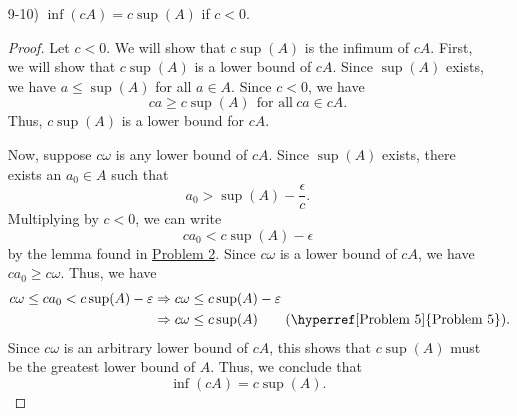 \documentclass[11pt,a4paper]{article}
\begin{document}
\begin{enumerate}
\begin{enumerate}
\begin{proof}
            Let \( c \varphi  \) be any upper bound of \( cA  \). Let \( \epsilon > 0 \). Since \( \inf(A)  \) exists, there exists \( {\lambda}_{0} \in A  \) such that 
            \[  {\lambda}_{0} < \inf(A) + \frac{ \epsilon }{ c } \]
            by the lemma found in {\hyperref[Problem 3]{Problem 3}}. 
            Since \( c < 0  \), we can multiply \( c  \) on both sides of the inequality above to get
            \[  c {\lambda}_{0} \geq c \inf(A) + \epsilon. \]
            But note that \( c \varphi  \) is an upper bound of \( cA  \). Thus, \( c {\lambda}_{0} \leq c \varphi \) and so we have 
            \[  c \varphi \geq c {\lambda}_{0} > c \inf(A) + \epsilon. \]
            Since \( \epsilon > 0 \) is arbitrary, we can use the result from {\hyperref[Problem 5]{Problem 5}} to state that 
            \[  c \varphi \geq c \inf(A). \]
            Which tells us that \( c \inf(A) \) is the least upper bound of \( cA  \). Hence, we conclude that \(  \sup(cA) = c \inf(A) \).
        \end{proof}
        \item[9-10)] \( \inf(cA) = c \sup (A) \) if \( c < 0  \).
            \begin{proof}
            Let \( c < 0  \). We will show that \( c \sup(A)  \) is the infimum of \( cA \). First, we will show that \( c \sup(A) \) is a lower bound of \( cA  \). Since \( \sup(A)  \) exists, we have \( a \leq \sup(A) \) for all \( a \in A  \). Since \( c < 0  \), we have
            \[  ca \geq c \sup(A) \ \ \text{for all} \ ca \in cA.  \]
            Thus, \( c \sup(A) \) is a lower bound for \( cA \).

            Now, suppose \( c \omega  \) is any lower bound of \( cA  \). Since \(  \sup(A) \) exists, there exists an \( {a}_{0} \in A  \) such that  
            \[  {a}_{0} > \sup(A) - \frac{ \epsilon }{ c }. \]
            Multiplying by \( c < 0  \), we can write
            \[  c {a}_{0} < c \sup(A) - \epsilon \]
            by the lemma found in {\hyperref[Problem 2]{Problem 2}}.
            Since \( c \omega  \) is a lower bound of \( cA  \), we have \( c {a}_{0} \geq c \omega  \). Thus, we have 
            \begin{align*}  c \omega \leq c {a}_{0} < c \sup(A) - \epsilon &\implies c \omega \leq c \sup(A) - \epsilon \\
                &\implies c \omega \leq c\sup(A) \tag{{\hyperref[Problem 5]{Problem 5}}}. 
            \end{align*}
           Since \( c \omega  \) is an arbitrary lower bound of \( cA  \), this shows that \( c \sup(A) \) must be the greatest lower bound of \( A  \). Thus, we conclude that 
        \[  \inf(cA) = c \sup(A). \]
            

\end{proof}
\end{enumerate}
\end{enumerate}
\end{document}
